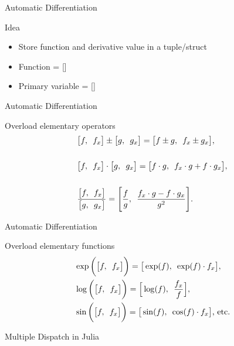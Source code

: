 \begin{frame}{Automatic Differentiation}
    \begin{block}{Idea}
        \begin{itemize}
            \item Store function and derivative value in a tuple/struct
            \item Function = []
            \item Primary variable = []
        \end{itemize}
    \end{block}
\end{frame}
\begin{frame}{Automatic Differentiation}
    \begin{block}{Overload elementary operators}
        \begin{equation*}
            \begin{aligned}
                &\big[f,\hspace{0.5em}f_x\big] \pm \big[g,\hspace{0.5em}g_x   \big] = \big[f \pm g,\hspace{0.5em}f_x \pm g_x \big] ,\\\\
                &\big[  f,\hspace{0.5em}f_x   \big]\cdot \big[  g,\hspace{0.5em}g_x   \big] = \big[  f\cdot g,\hspace{0.5em}f_x\cdot g + f\cdot g_x   \big],\\\\
                &\frac{\big[ f,\hspace{0.5em}f_x   \big]}{\big[  g,\hspace{0.5em}g_x   \big]} = \Bigg[  \frac{f}{g},\hspace{0.5em}\frac{f_x\cdot g - f\cdot g_x}{g^2}\Bigg].
            \end{aligned}
        \end{equation*}
    \end{block}
\end{frame}
\begin{frame}{Automatic Differentiation}
    \begin{block}{Overload elementary functions}
        \begin{equation*}
            \begin{aligned}
                &\exp\bigg(\big[ f,\hspace{0.5em}f_x  \big]\bigg) =  \big[ \exp(f),\hspace{0.5em}\exp(f)\cdot f_x  \big],\\
                &\log\bigg(\big[ f,\hspace{0.5em}f_x  \big]\bigg) =  \Big[  \log(f),\hspace{0.5em}\frac{f_x}{f}   \Big],\\
                &\sin\bigg(\big[  f,\hspace{0.5em}f_x   \big]\bigg) =  \big[  \sin(f),\hspace{0.5em}\cos(f)\cdot f_x   \big]\text{,  etc.}
            \end{aligned}
        \end{equation*}
    \end{block}
    \pause
    \centering
    \vspace{2em}
    \Huge Multiple Dispatch in Julia
\end{frame}
